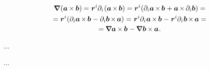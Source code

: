 \begin{otherlanguage}{russian}
\nopagebreak\vspace{-0.4em}\begin{multline}\label{gradientofcrossproductoftwovectors}
\boldnabla \hspace{-0.2ex} \left( \bm{a} \hspace{-0.1ex} \times \hspace{-0.1ex} \bm{b} \right) \hspace{-0.1ex}
= \hspace{.1ex} \bm{r}^i \partial_i \hspace{-0.2ex} \left( \bm{a} \hspace{-0.2ex} \times \hspace{-0.2ex} \bm{b} \right)
= \bm{r}^i \hspace{-0.32ex} \left( \partial_i \bm{a} \hspace{-0.2ex} \times \hspace{-0.2ex} \bm{b} \hspace{.1ex} +
\bm{a} \hspace{-0.2ex} \times \hspace{-0.2ex} \partial_i \bm{b} \right) =
\\[-0.1em]
%
= \bm{r}^i \hspace{-0.32ex} \left( \partial_i \bm{a} \hspace{-0.2ex} \times \hspace{-0.2ex} \bm{b} \hspace{.1ex} -
\partial_i \bm{b} \hspace{-0.2ex} \times \hspace{-0.2ex} \bm{a} \right)
= \hspace{.1ex} \bm{r}^i \partial_i \hspace{.1ex} \bm{a} \hspace{-0.2ex} \times \hspace{-0.2ex} \bm{b} \hspace{.1ex} - \hspace{.1ex}
\bm{r}^i \partial_i \hspace{.1ex} \bm{b} \hspace{-0.2ex} \times \hspace{-0.2ex} \bm{a} =
\\[-0.1em]
%
= \hspace{-0.12ex} \boldnabla \bm{a} \hspace{-0.1ex} \times \hspace{-0.1ex} \bm{b} \hspace{.12ex} - \hspace{-0.12ex}
\boldnabla \hspace{.1ex} \bm{b} \hspace{-0.1ex} \times \hspace{-0.1ex} \bm{a} \hspace{.1ex} .
\end{multline}

\newpage ...

\newpage ...



\end{otherlanguage}

